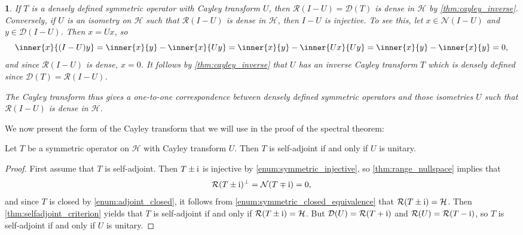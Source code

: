 \documentclass[article, a4paper, 11pt, oneside]{memoir}
\makeatletter
\numberwithin{equation}{chapter}
\newcommand{\calH}{\mathcal{H}}
\newcommand{\dom}{\mathcal{D}}
\newcommand{\range}{\mathcal{R}}
\newcommand{\nullspace}{\mathcal{N}}
\theoremstyle{myexample}
\newtheorem{remark}[theorem]{\protect\@remark}
\theoremstyle{myexample}
\theoremstyle{myexamplebreak}
\theoremstyle{myexamplebreak}
\theoremstyle{nonumberplain}
\newtheorem{proof}{\protect\@proof}
\theoremstyle{MyNonumberplain}
\newcommand{\@remark}{}
\newcommand{\@proof}{}
\renewcommand{\@remark}{Remark}%
\renewcommand{\@proof}{Proof}%
\renewcommand{\@remark}{Bemærkning}%
\renewcommand{\@proof}{Bevis}%
\makeatother
\begin{document}
\begin{remark}
    \label{rem:cayley_dense}
    If $T$ is a \emph{densely defined} symmetric operator with Cayley transform $U$, then $\range(I - U) = \dom(T)$ is dense in $\calH$ by \cref{thm:cayley_inverse}. Conversely, if $U$ is an isometry on $\calH$ such that $\range(I - U)$ is dense in $\calH$, then $I - U$ is injective. To see this, let $x \in \nullspace(I - U)$ and $y \in \dom(I - U)$. Then $x = Ux$, so
    \begin{equation*}
        \inner{x}{(I - U)y}
            = \inner{x}{y} - \inner{x}{Uy}
            = \inner{x}{y} - \inner{Ux}{Uy}
            = \inner{x}{y} - \inner{x}{y}
            = 0,
    \end{equation*}
    and since $\range(I-U)$ is dense, $x = 0$. It follows by \cref{thm:cayley_inverse} that $U$ has an inverse Cayley transform $T$ which is densely defined since $\dom(T) = \range(I-U)$.
    
    The Cayley transform thus gives a one-to-one correspondence between densely defined symmetric operators and those isometries $U$ such that $\range(I- U)$ is dense in $\calH$.
\end{remark}

We now present the form of the Cayley transform that we will use in the proof of the spectral theorem:

\begin{theorem}
    \label{thm:cayley_selfadjoint}
    Let $T$ be a symmetric operator on $\calH$ with Cayley transform $U$. Then $T$ is self-adjoint if and only if $U$ is unitary.
\end{theorem}

\begin{proof}
    First assume that $T$ is self-adjoint. Then $T \pm \operatorname{i}$ is injective by \cref{enum:symmetric_injective}, so \cref{thm:range_nullspace} implies that
    \begin{equation*}
        \range(T \pm \iu)^\perp
            = \nullspace(T \mp \iu)
            = 0,
    \end{equation*}
    and since $T$ is closed by \cref{enum:adjoint_closed}, it follows from \cref{enum:symmetric_closed_equivalence} that $\range(T \pm \iu) = \calH$. Then \cref{thm:selfadjoint_criterion} yields that $T$ is self-adjoint if and only if $\range(T \pm \iu) = \calH$. But $\dom(U) = \range(T + \iu)$ and $\range(U) = \range(T - \iu)$, so $T$ is self-adjoint if and only if $U$ is unitary.
\end{proof}
\end{document}

